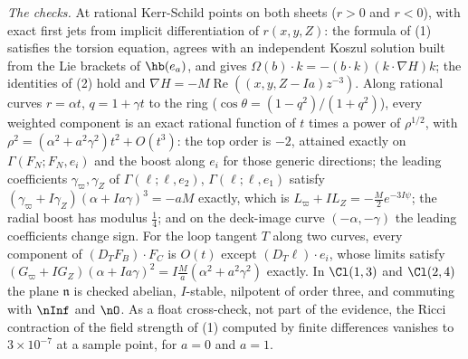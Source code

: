 \emph{The checks.} At rational Kerr-Schild points on both sheets ($r > 0$ and $r < 0$), with exact first jets from implicit differentiation of $r(x, y, Z)$: the formula of (1) satisfies the torsion equation, agrees with an independent Koszul solution built from the Lie brackets of $\hb(e_a)$, and gives $\Omega(b) \cdot k = -(b \cdot k)(k \cdot \nabla H)k$; the identities of (2) hold and $\nabla H = -M\operatorname{Re}((x, y, Z - Ia)z^{-3})$. Along rational curves $r = \alpha t$, $q = 1 + \gamma t$ to the ring ($\cos\theta = (1 - q^2)/(1 + q^2)$), every weighted component is an exact rational function of $t$ times a power of $\rho^{1/2}$, with $\rho^2 = (\alpha^2 + a^2\gamma^2)t^2 + O(t^3)$: the top order is $-2$, attained exactly on $\Gamma(F_N; F_N, e_i)$ and the boost along $e_i$ for those generic directions; the leading coefficients $\gamma_\varpi, \gamma_Z$ of $\Gamma(\ell; \ell, e_2)$, $\Gamma(\ell; \ell, e_1)$ satisfy $(\gamma_\varpi + I\gamma_Z)(\alpha + Ia\gamma)^3 = -aM$ exactly, which is $L_\varpi + IL_Z = -\tfrac{M}{2}e^{-3I\psi}$; the radial boost has modulus $\tfrac14$; and on the deck-image curve $(-\alpha, -\gamma)$ the leading coefficients change sign. For the loop tangent $T$ along two curves, every component of $(D_T F_B) \cdot F_C$ is $O(t)$ except $(D_T\ell) \cdot e_i$, whose limits satisfy $(G_\varpi + IG_Z)(\alpha + Ia\gamma)^2 = I\tfrac{M}{a}(\alpha^2 + a^2\gamma^2)$ exactly. In $\Cl(1,3)$ and $\Cl(2,4)$ the plane $\mathfrak n$ is checked abelian, $I$-stable, nilpotent of order three, and commuting with $\nInf$ and $\nO$. As a float cross-check, not part of the evidence, the Ricci contraction of the field strength of (1) computed by finite differences vanishes to $3 \times 10^{-7}$ at a sample point, for $a = 0$ and $a = 1$.
